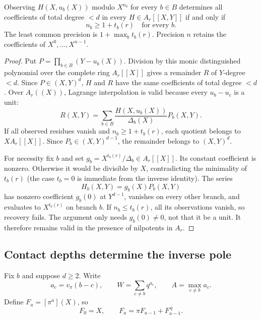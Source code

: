 \begin{proposition}\label{prop:jet-threshold}
Observing $H(X,u_b(X))$ modulo $X^{n_b}$ for every $b\in B$ determines all coefficients of total degree $<d$ in every $H\in A_r[[X,Y]]$ if and only if
\[
 n_b\ge1+t_b(r)\quad\text{for every }b.
\]
The least common precision is $1+\max_b t_b(r)$. Precision $n$ retains the coefficients of $X^0,\ldots,X^{n-1}$.
\end{proposition}

\begin{proof}
Put $P=\prod_{b\in B}(Y-u_b(X))$. Division by this monic distinguished polynomial over the complete ring $A_r[[X]]$ gives a remainder $R$ of $Y$-degree $<d$. Since $P\in(X,Y)^d$, $H$ and $R$ have the same coefficients of total degree $<d$. Over $A_r((X))$, Lagrange interpolation is valid because every $u_b-u_c$ is a unit:
\[
 R(X,Y)=\sum_{b\in B}\frac{H(X,u_b(X))}{\Delta_b(X)}P_b(X,Y).
\]
If all observed residues vanish and $n_b\ge1+t_b(r)$, each quotient belongs to $XA_r[[X]]$. Since $P_b\in(X,Y)^{d-1}$, the remainder belongs to $(X,Y)^d$.

For necessity fix $b$ and set
$g_b=X^{t_b(r)}/\Delta_b\in A_r[[X]]$. Its constant coefficient is nonzero. Otherwise it would be divisible by $X$, contradicting the minimality of $t_b(r)$ (the case $t_b=0$ is immediate from the inverse identity). The series
\[
 H_b(X,Y)=g_b(X)P_b(X,Y)
\]
has nonzero coefficient $g_b(0)$ at $Y^{d-1}$, vanishes on every other branch, and evaluates to $X^{t_b(r)}$ on branch $b$. If $n_b\le t_b(r)$, all its observations vanish, so recovery fails. The argument only needs $g_b(0)\ne0$, not that it be a unit. It therefore remains valid in the presence of nilpotents in $A_r$.
\end{proof}

\subsection{Contact depths determine the inverse pole}

Fix $b$ and suppose $d\ge2$. Write
\[
 a_c=v_\pi(b-c),\qquad
 W=\sum_{c\ne b}q^{a_c},\qquad
 A=\max_{c\ne b}a_c.
\]
Define $F_a=[\pi^a](X)$, so
\begin{equation}\label{eq:lt-recurrence}
 F_0=X,\qquad F_a=\pi F_{a-1}+F_{a-1}^{\,q}.
\end{equation}

